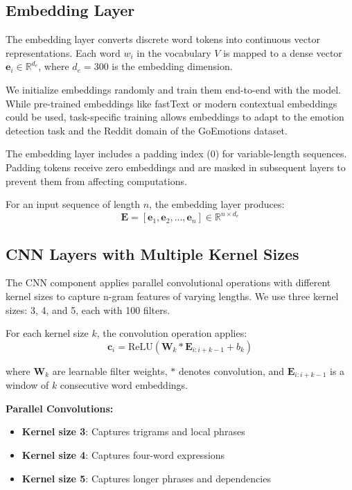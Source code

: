\documentclass[12pt,a4paper]{article}
\begin{document}
\subsection{Embedding Layer}

The embedding layer converts discrete word tokens into continuous vector representations. Each word $w_i$ in the vocabulary $V$ is mapped to a dense vector $\mathbf{e}_i \in \mathbb{R}^{d_e}$, where $d_e=300$ is the embedding dimension.

We initialize embeddings randomly and train them end-to-end with the model. While pre-trained embeddings like fastText \cite{joulin2017fasttext} or modern contextual embeddings could be used, task-specific training allows embeddings to adapt to the emotion detection task and the Reddit domain of the GoEmotions dataset.

The embedding layer includes a padding index (0) for variable-length sequences. Padding tokens receive zero embeddings and are masked in subsequent layers to prevent them from affecting computations.

For an input sequence of length $n$, the embedding layer produces:
$$\mathbf{E} = [\mathbf{e}_1, \mathbf{e}_2, ..., \mathbf{e}_n] \in \mathbb{R}^{n \times d_e}$$

\subsection{CNN Layers with Multiple Kernel Sizes}

The CNN component applies parallel convolutional operations with different kernel sizes to capture n-gram features of varying lengths. We use three kernel sizes: 3, 4, and 5, each with 100 filters.

For each kernel size $k$, the convolution operation applies:
$$\mathbf{c}_i = \text{ReLU}(\mathbf{W}_k * \mathbf{E}_{i:i+k-1} + b_k)$$

where $\mathbf{W}_k$ are learnable filter weights, $*$ denotes convolution, and $\mathbf{E}_{i:i+k-1}$ is a window of $k$ consecutive word embeddings.

\textbf{Parallel Convolutions:}
\begin{itemize}
    \item \textbf{Kernel size 3}: Captures trigrams and local phrases
    \item \textbf{Kernel size 4}: Captures four-word expressions
    \item \textbf{Kernel size 5}: Captures longer phrases and dependencies
\end{itemize}
\end{document}

